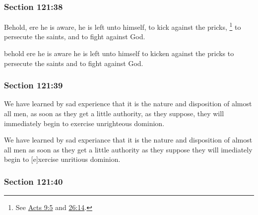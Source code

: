 	\subsubsection{Section 121:38} %
		\label{DC121-38}
		
		Behold, ere he is aware, he is left unto himself, to kick against the pricks,%
			\footnote{%
				See \hyperref[ACTS-9-5]{Acts 9:5} and \hyperref[ACTS-26-14]{26:14}.
				}
		to persecute the saints, and to fight against God.
		
		\begin{framed}
		\scriptsize
			\begin{compactdesc}
				\item[JSP] behold ere he is aware he is left unto himself to kicken against the pricks to persecute the saints and to fight against God.
			\end{compactdesc}
		\end{framed}
		
	\subsubsection{Section 121:39} %
		\label{DC121-39}
		
		We have learned by sad experience that it is the nature and disposition of almost all men, as soon as they get a little authority, as they suppose, they will immediately begin to exercise unrighteous dominion.
		
		\begin{framed}
		\scriptsize
			\begin{compactdesc}
				\item[JSP] We have learned by sad experiance that it is the nature and disposition of almost all men as soon as they get a little authority as they suppose they will imediately begin to [e]xercise unritious dominion.
			\end{compactdesc}
		\end{framed}
		
	\subsubsection{Section 121:40} %
		\label{DC121-40}
		

